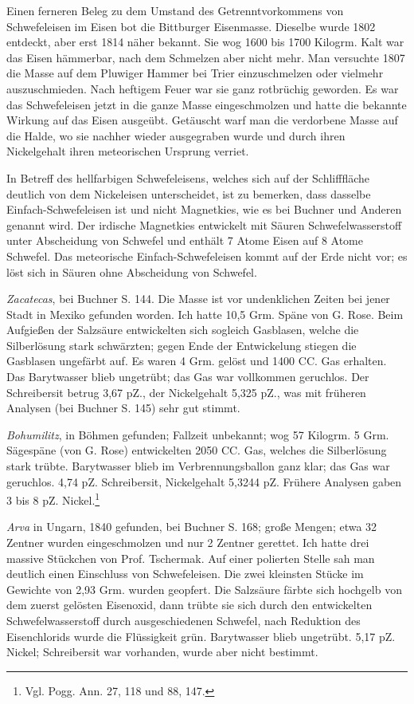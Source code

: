 \documentclass[a4paper, 11pt, oneside, german]{article}
\begin{document}
Einen ferneren Beleg zu dem Umstand des Getrenntvorkommens von Schwefeleisen im Eisen bot die Bittburger Eisenmasse. Dieselbe wurde 1802 entdeckt, aber erst 1814 näher bekannt. Sie wog 1600 bis 1700 Kilogrm. Kalt war das Eisen hämmerbar, nach dem Schmelzen aber nicht mehr. Man versuchte 1807 die Masse auf dem Pluwiger Hammer bei Trier einzuschmelzen oder vielmehr auszuschmieden. Nach heftigem Feuer war sie ganz rotbrüchig geworden. Es war das Schwefeleisen jetzt in die ganze Masse eingeschmolzen und hatte die bekannte Wirkung auf das Eisen ausgeübt. Getäuscht warf man die verdorbene Masse auf die Halde, wo sie nachher wieder ausgegraben wurde und durch ihren Nickelgehalt ihren meteorischen Ursprung verriet.

In Betreff des hellfarbigen Schwefeleisens, welches sich auf der Schlifffläche deutlich von dem Nickeleisen unterscheidet, ist zu bemerken, dass dasselbe Einfach-Schwefeleisen ist und nicht Magnetkies, wie es bei Buchner und Anderen genannt wird. Der irdische Magnetkies entwickelt mit Säuren Schwefelwasserstoff unter Abscheidung von Schwefel und enthält 7 Atome Eisen auf 8 Atome Schwefel. Das meteorische Einfach-Schwefeleisen kommt auf der Erde nicht vor; es löst sich in Säuren ohne Abscheidung von Schwefel.

\emph{Zacatecas}, bei Buchner S. 144. Die Masse ist vor undenklichen Zeiten bei jener Stadt in Mexiko gefunden worden. Ich hatte 10,5 Grm. Späne von G. Rose. Beim Aufgießen der Salzsäure entwickelten sich sogleich Gasblasen, welche die Silberlösung stark schwärzten; gegen Ende der Entwickelung stiegen die Gasblasen ungefärbt auf. Es waren 4 Grm. gelöst und 1400 CC. Gas erhalten. Das Barytwasser blieb ungetrübt; das Gas war vollkommen geruchlos. Der Schreibersit betrug 3,67 pZ., der Nickelgehalt 5,325 pZ., was mit früheren Analysen (bei Buchner S. 145) sehr gut stimmt.

\emph{Bohumilitz}, in Böhmen gefunden; Fallzeit unbekannt; wog 57 Kilogrm. 5 Grm. Sägespäne (von G. Rose) entwickelten 2050 CC. Gas, welches die Silberlösung stark trübte. Barytwasser blieb im Verbrennungsballon ganz klar; das Gas war geruchlos. 4,74 pZ. Schreibersit, Nickelgehalt 5,3244 pZ. Frühere Analysen gaben 3 bis 8 pZ. Nickel.\footnote{Vgl. Pogg. Ann. 27, 118 und 88, 147.}

\emph{Arva} in Ungarn, 1840 gefunden, bei Buchner S. 168; große Mengen; etwa 32 Zentner wurden eingeschmolzen und nur 2 Zentner gerettet. Ich hatte drei massive Stückchen von Prof. Tschermak. Auf einer polierten Stelle sah man deutlich einen Einschluss von Schwefeleisen. Die zwei kleinsten Stücke im Gewichte von 2,93 Grm. wurden geopfert. Die Salzsäure färbte sich hochgelb von dem zuerst gelösten Eisenoxid, dann trübte sie sich durch den entwickelten Schwefelwasserstoff durch ausgeschiedenen Schwefel, nach Reduktion des Eisenchlorids wurde die Flüssigkeit grün. Barytwasser blieb ungetrübt. 5,17 pZ. Nickel; Schreibersit war vorhanden, wurde aber nicht bestimmt.
\end{document}
